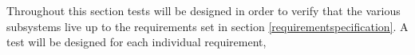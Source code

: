 
Throughout this section tests will be designed in order to verify that the various subsystems live up to the requirements set in section \ref{requirementspecification}.
A test will be designed for each individual requirement, 




